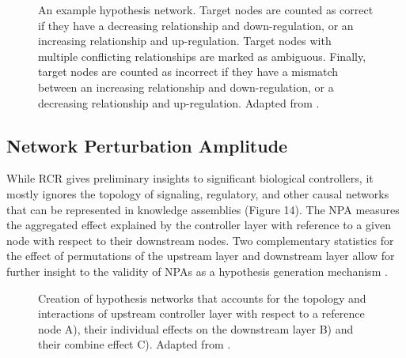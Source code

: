 \begin{figure}
\captionsetup{format=plain}
\caption[A Schematic Diagram of \ac{RCR}]{An example hypothesis network. Target nodes are counted as correct if they have a decreasing relationship and down-regulation, or an increasing relationship and up-regulation. Target nodes with multiple conflicting relationships are marked as ambiguous. Finally, target nodes are counted as incorrect if they have a mismatch between an increasing relationship and down-regulation, or a decreasing relationship and up-regulation. Adapted from \cite{Catlett2013}.}
\label{Fig:rcr_schematic}
\end{figure}

\subsection{Network Perturbation Amplitude}

While \ac{RCR} gives preliminary insights to significant biological controllers, it mostly ignores the topology of signaling, regulatory, and other causal networks that can be represented in knowledge assemblies (Figure 14). The \ac{NPA} measures the aggregated effect explained by the controller layer with reference to a given node with respect to their downstream nodes. Two complementary statistics for the effect of permutations of the upstream layer and downstream layer allow for further insight to the validity of \ac{NPA}s as a hypothesis generation mechanism \cite{Martin2014}.

\begin{figure}
\captionsetup{format=plain}
\caption[Hypothesis Network Generation for Network Perturbation Amplitude]{Creation of hypothesis networks that accounts for the topology and interactions of  upstream controller layer with respect to a reference node A), their individual effects on the downstream layer B) and their combine effect C). Adapted from \cite{Martin2012}.}
\label{Fig:npa_schematic}
\end{figure}

